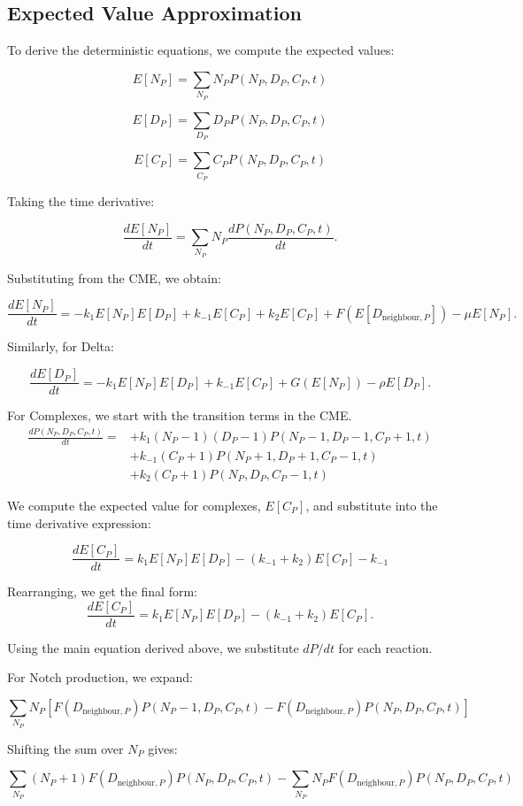 \documentclass{article}
\begin{document}
\subsection{Expected Value Approximation}
To derive the deterministic equations, we compute the expected values:

\[
E[N_P] = \sum_{N_P} N_P P(N_P, D_P, C_P, t)
\]

\[
E[D_P] = \sum_{D_P} D_P P(N_P, D_P, C_P, t)
\]

\[
E[C_P] = \sum_{C_P} C_P P(N_P, D_P, C_P, t)
\]

Taking the time derivative:

\[
\frac{dE[N_P]}{dt} = \sum_{N_P} N_P \frac{dP(N_P, D_P, C_P, t)}{dt}.
\]

Substituting from the CME, we obtain:

\[
\frac{dE[N_P]}{dt} = -k_1 E[N_P]E[D_P] + k_{-1}E[C_P] + k_2 E[C_P] + F(E[D_{\text{neighbour},P}]) - \mu E[N_P].
\]

Similarly, for Delta:

\[
\frac{dE[D_P]}{dt} = -k_1 E[N_P]E[D_P] + k_{-1}E[C_P] + G(E[N_P]) - \rho E[D_P].
\]

For Complexes, we start with the transition terms in the CME.
\begin{align*}
\frac{dP(N_P, D_P, C_P, t)}{dt} = &+ 
 k_1 (N_P - 1)(D_P - 1) P(N_P - 1, D_P - 1, C_P + 1, t)\\
& + k_{-1} (C_P + 1) P(N_P + 1, D_P + 1, C_P - 1, t)\\
& + k_2 (C_P + 1) P(N_P, D_P, C_P - 1, t)
\end{align*}

We compute the expected value for complexes, \( E[C_P] \), and substitute into the time derivative expression:

\[
\frac{dE[C_P]}{dt} = k_1 E[N_P] E[D_P] - (k_{-1} + k_2) E[C_P] - k_{-1}
\]

Rearranging, we get the final form:
\[
\frac{dE[C_P]}{dt} = k_1 E[N_P]E[D_P] - (k_{-1} + k_2) E[C_P].
\]

Using the main equation derived above, we substitute \( dP/dt \) for each reaction.

For Notch production, we expand:

\[
\sum_{N_P} N_P \left[ F(D_{\text{neighbour},P}) P(N_P - 1, D_P, C_P, t) - F(D_{\text{neighbour},P}) P(N_P, D_P, C_P, t) \right]
\]

Shifting the sum over \( N_P \) gives:

\[
\sum_{N_P} (N_P + 1) F(D_{\text{neighbour},P}) P(N_P, D_P, C_P, t) - \sum_{N_P} N_P F(D_{\text{neighbour},P}) P(N_P, D_P, C_P, t)
\]
\end{document}
